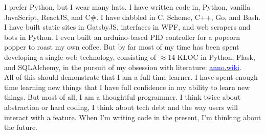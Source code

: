 \documentclass[9pt]{developercv} %
\begin{document}



\large
I prefer Python, but I wear many hats. I have written code in,
Python, vanilla JavaScript, ReactJS, and C\#. I have dabbled in C, Scheme, C++,
Go, and Bash. I have built static sites in GatsbyJS, interfaces in WPF, and web
scrapers and bots in Python. I even built an arduino-based PID controller for a
popcorn popper to roast my own coffee. But by far most of my time has been spent
developing a single web technology, consisting of $\approx$14 KLOC
in Python, Flask, and SQLAlchemy, in the pursuit of my obsession with
literature:
{\href{https://github.com/malan88/icc}{\textcolor{Blue}{anno.wiki}}}.\\

All of this should demonstrate that I am a full time learner. I have spent
enough time learning new things that I have full confidence in my ability to
learn new things. But most of all, I am a thoughtful programmer. I think
twice about abstraction or hard coding, I think about tech debt and the way
users will interact with a feature. When I'm writing code in the present,
I'm thinking about the future.


\end{document}
